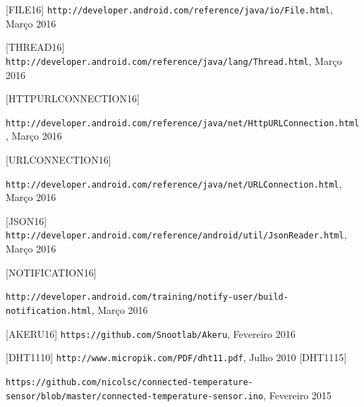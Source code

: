 \documentclass[a4paper]{article}
\begin{document}
\begin{itemize}
\end{itemize}


\begin{thebibliography}{9}

  [FILE16] \texttt{http://developer.android.com/reference/java/io/File.html}, Março 2016
  
  [THREAD16] \texttt{http://developer.android.com/reference/java/lang/Thread.html}, Março 2016
  
  [HTTPURLCONNECTION16] \begin{sloppypar} \texttt{http://developer.android.com/reference/java/net/HttpURLConnection.html}, Março 2016 \end{sloppypar}
  
  [URLCONNECTION16] \begin{sloppypar}\texttt{http://developer.android.com/reference/java/net/URLConnection.html}, Março 2016 \end{sloppypar}
  
  [JSON16] \texttt{http://developer.android.com/reference/android/util/JsonReader.html}, Março 2016
  
  [NOTIFICATION16] \begin{sloppypar}\texttt{http://developer.android.com/training/notify-user/build-notification.html}, Março 2016 \end{sloppypar}
  
  [AKERU16] \texttt{https://github.com/Snootlab/Akeru}, Fevereiro 2016
  
  [DHT1110] \texttt{http://www.micropik.com/PDF/dht11.pdf}, Julho 2010
  [DHT1115] \begin{sloppypar} \texttt{https://github.com/nicolsc/connected-temperature-sensor/blob/master/connected-temperature-sensor.ino}, Fevereiro 2015  \end{sloppypar}


\end{thebibliography}
\end{document}

